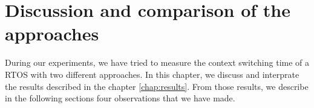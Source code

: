 \chapter{Discussion and comparison of the approaches\label{chap:discuss}}

During our experiments, we have tried to measure the context switching time of a RTOS with two different approaches.
In this chapter, we discuss and interprate the results described in the chapter \ref{chap:results}.
From those results, we describe in the following sections four observations that we have made.





